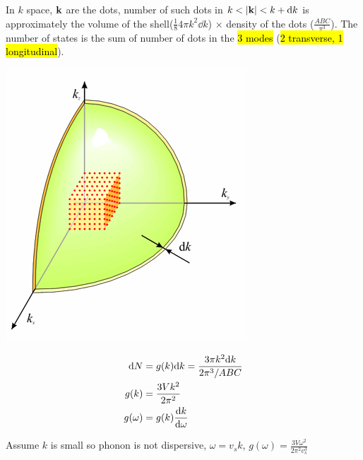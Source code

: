 \documentclass{article}
\theoremstyle{remark}
\theoremstyle{remark}
\begin{document}
\begin{enumerate}
\begin{itemize}
            In $k$ space, $\vb{k}$ are the dots, number of such dots in $k<|\vb{k}|<k+\dd k$ is approximately the volume of the shell($\frac{1}{8}4\pi k^2\dd k$) $\times$ density of the dots ($\frac{ABC}{\pi^3}$).
            The number of states is the sum of number of dots in the \hl{3 modes} (\hl{2 transverse, 1 longitudinal}).
            \begin{minipage}{0.5\linewidth}
                \begin{center}
                    \includegraphics*[width=0.4\linewidth]{cmp_debye_count_N.png}
                \end{center}
            \end{minipage}
            \begin{minipage}{0.5\linewidth}
                \begin{align*}
                    \dd N &= g(k)\dd k=\frac{3\pi k^2\dd k}{2\pi^3/ABC}\\
                    g(k) &= \frac{3Vk^2}{2\pi^2}\\
                    g(\omega) &= g(k)\dv{k}{\omega}
                \end{align*}
            \end{minipage}
            
            Assume $k$ is small so phonon is not dispersive, $\omega=v_s k$, $g(\omega) = \frac{3V\omega^2}{2\pi^2v_s^3}$
            

\end{itemize}
\end{enumerate}
\end{document}
